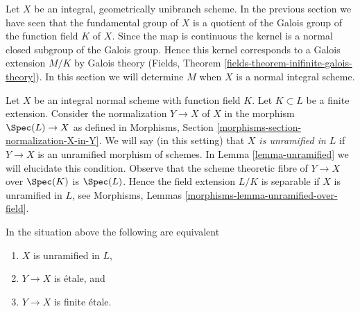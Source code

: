 \noindent
Let $X$ be an integral, geometrically unibranch scheme. In the previous section
we have seen that the fundamental group of $X$ is a quotient of the
Galois group of the function field $K$ of $X$. Since the map is continuous
the kernel is a normal closed subgroup of the Galois group. Hence this kernel
corresponds to a Galois extension $M/K$ by Galois theory
(Fields, Theorem \ref{fields-theorem-inifinite-galois-theory}).
In this section we will determine $M$ when $X$ is a normal integral scheme.

\medskip\noindent
Let $X$ be an integral normal scheme with function field $K$.
Let $K \subset L$ be a finite extension. Consider the normalization
$Y \to X$ of $X$ in the morphism $\Spec(L) \to X$ as defined in
Morphisms, Section \ref{morphisms-section-normalization-X-in-Y}.
We will say (in this setting) that {\it $X$ is unramified in $L$}
if $Y \to X$ is an unramified morphism of schemes. In
Lemma \ref{lemma-unramified} we will elucidate this condition.
Observe that the scheme theoretic fibre of $Y \to X$ over $\Spec(K)$
is $\Spec(L)$. Hence the field extension $L/K$ is separable if $X$ is
unramified in $L$, see
Morphisms, Lemmas \ref{morphisms-lemma-unramified-over-field}.

\begin{lemma}
\label{lemma-unramified-in-L}
In the situation above the following are equivalent
\begin{enumerate}
\item $X$ is unramified in $L$,
\item $Y \to X$ is \'etale, and
\item $Y \to X$ is finite \'etale.
\end{enumerate}
\end{lemma}

